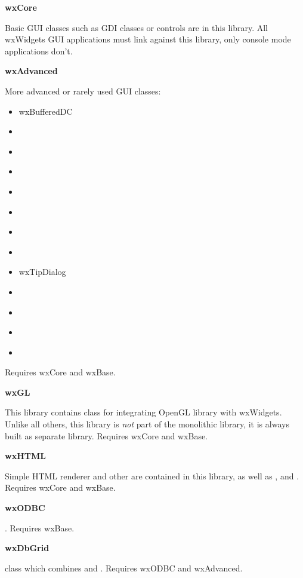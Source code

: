 {\large {\bf wxCore}}

Basic GUI classes such as GDI classes or controls are in this library. All
wxWidgets GUI applications must link against this library, only console mode
applications don't.

{\large {\bf wxAdvanced}}

More advanced or rarely used GUI classes:

\begin{itemize}\itemsep=0pt
\item{ wxBufferedDC }
\item{  }
\item{  }
\item{  }
\item{  }
\item{  }
\item{  }
\item{  }
\item{ wxTipDialog }
\item{  }
\item{  }
\item{  }
\item{  }
\end{itemize}

Requires wxCore and wxBase.

{\large {\bf wxGL}}

This library contains  class for integrating
OpenGL library with wxWidgets. Unlike all others, this library is {\em not}
 part of the monolithic library, it is always built as separate library.
Requires wxCore and wxBase.

{\large {\bf wxHTML}}

Simple HTML renderer and other  are
contained in this library, as well as
 ,
  and
 . Requires wxCore and wxBase.

{\large {\bf wxODBC}}

. Requires wxBase.

{\large {\bf wxDbGrid}}

 class which combines 
  and . 
Requires wxODBC and wxAdvanced.

